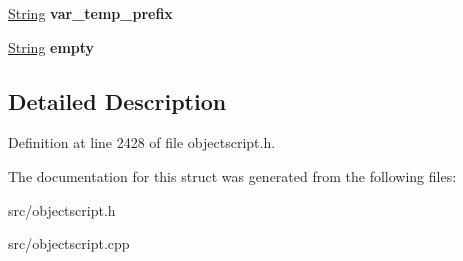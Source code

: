 \begin{DoxyCompactItemize}
\item 
\hyperlink{class_object_script_1_1_o_s_1_1_core_1_1_string}{String} {\bfseries var\+\_\+temp\+\_\+prefix}\hypertarget{struct_object_script_1_1_o_s_1_1_core_1_1_strings_a1cc0dde0c97bc125ebc7a311cb4e4852}{}\label{struct_object_script_1_1_o_s_1_1_core_1_1_strings_a1cc0dde0c97bc125ebc7a311cb4e4852}

\item 
\hyperlink{class_object_script_1_1_o_s_1_1_core_1_1_string}{String} {\bfseries empty}\hypertarget{struct_object_script_1_1_o_s_1_1_core_1_1_strings_a0b6efb6e4bef6104f05513d871cb8031}{}\label{struct_object_script_1_1_o_s_1_1_core_1_1_strings_a0b6efb6e4bef6104f05513d871cb8031}

\end{DoxyCompactItemize}


\subsection{Detailed Description}


Definition at line 2428 of file objectscript.\+h.



The documentation for this struct was generated from the following files\+:\begin{DoxyCompactItemize}
\item 
src/objectscript.\+h\item 
src/objectscript.\+cpp\end{DoxyCompactItemize}
